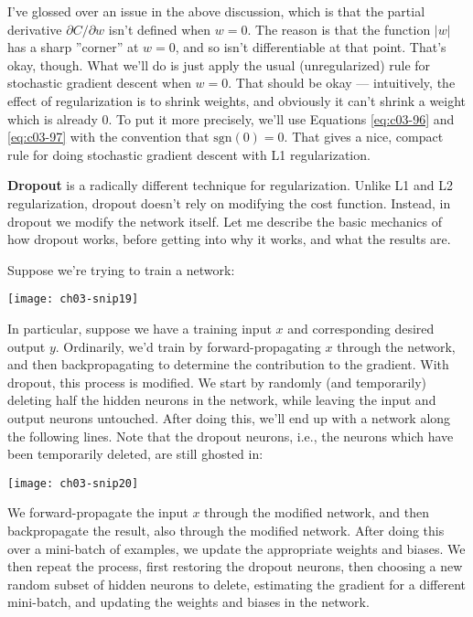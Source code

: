 I've glossed over an issue in the above discussion, which is that the partial derivative $\partial C / \partial w$ isn't defined when $w=0$. The reason is that the function $|w|$ has a sharp ''corner'' at $w=0$, and so isn't differentiable at that point. That's okay, though. What we'll do is just apply the usual (unregularized) rule for stochastic gradient descent when $w=0$. That should be okay --- intuitively, the effect of regularization is to shrink weights, and obviously it can't shrink a weight which is already 0. To put it more precisely, we'll use Equations \ref{eq:c03-96} and \ref{eq:c03-97} with the convention that $\textrm{sgn}(0)=0$. That gives a nice, compact rule for doing stochastic gradient descent with L1 regularization.

\textbf{Dropout}  is a radically different technique for regularization. Unlike L1 and L2 regularization, dropout doesn't rely on modifying the cost function. Instead, in dropout we modify the network itself. Let me describe the basic mechanics of how dropout works, before getting into why it works, and what the results are.

Suppose we're trying to train a network:
\begin{marginfigure}
\texttt{[image: ch03-snip19]}
\end{marginfigure}
    
In particular, suppose we have a training input $x$ and corresponding desired output $y$. Ordinarily, we'd train by forward-propagating $x$ through the network, and then backpropagating to determine the contribution to the gradient. With dropout, this process is modified. We start by randomly (and temporarily) deleting half the hidden neurons in the network, while leaving the input and output neurons untouched. After doing this, we'll end up with a network along the following lines. Note that the dropout neurons, i.e., the neurons which have been temporarily deleted, are still ghosted in:
\begin{marginfigure}
    \texttt{[image: ch03-snip20]}
    \end{marginfigure}
    

We forward-propagate the input $x$ through the modified network, and then backpropagate the result, also through the modified network. After doing this over a mini-batch of examples, we update the appropriate weights and biases. We then repeat the process, first restoring the dropout neurons, then choosing a new random subset of hidden neurons to delete, estimating the gradient for a different mini-batch, and updating the weights and biases in the network.

